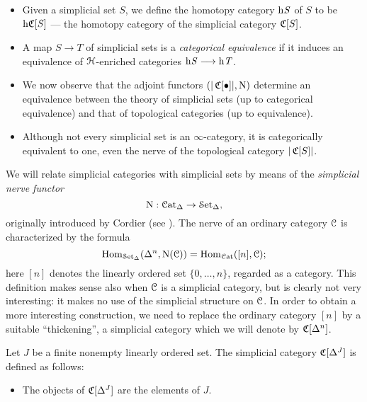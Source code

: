 \begin{1.1.5 inf-cats vs simplicial cats}
\begin{shaded}
\begin{itemize}
\begin{itemize}\squishlist
\item Given a simplicial set $S$, we define the homotopy category $\rm{h} \it{S}$ of $S$ to be $\rm{h} \it{\operatorname{\mathfrak{C}}}[S]$ --- the homotopy category of the simplicial category $\operatorname{\mathfrak{C}}[S]$.
\item A map $S\to T$ of simplicial sets is a \textit{categorical equivalence} if it induces an equivalence of $\operatorname{\mathcal{H}}$-enriched categories $\rm{h} \it{S}\longrightarrow\rm{h} \it{T}$.
\item We now observe that the adjoint functors $(|\operatorname{\mathfrak{C}}[ \bullet ]|, \operatorname{N} )$
determine an equivalence between the theory of simplicial sets (up to categorical equivalence)
and that of topological categories (up to equivalence). 
\item Although not every simplicial set is an $\infty$-category, it is categorically equivalent to one, even the nerve of the topological category $|\operatorname{\mathfrak{C}}[S]|$.
\end{itemize}
\end{itemize}
\end{shaded}


We will relate simplicial categories with simplicial sets by means of the {\it simplicial nerve functor}
$$ \operatorname{N}: \operatorname{\mathcal{C}at_{\Delta}} \rightarrow \operatorname{\mathcal{S}et_{\Delta}},$$
originally introduced by Cordier (see \cite{coherentnerve}).
The nerve of an ordinary category $\operatorname{\mathcal{C}}$ is characterized by the formula
$$ \operatorname{Hom}_{ \operatorname{\mathcal{S}et_{\Delta}}}( \Delta^n, \operatorname{N}(\operatorname{\mathcal{C}})) = \operatorname{Hom}_{\operatorname{\mathcal{C}at}}( [n], \operatorname{\mathcal{C}} );$$
here $[n]$ denotes the linearly ordered set $\{ 0, \ldots, n\}$, regarded
as a category. This
definition makes sense also when $\operatorname{\mathcal{C}}$ is a simplicial
category, but is clearly not very interesting: it makes no use of
the simplicial structure on $\operatorname{\mathcal{C}}$. In order to obtain a more interesting construction,
we need to replace the ordinary category $[n]$ by a suitable ``thickening'', a simplicial
category which we will denote by $\operatorname{\mathfrak{C}}[\Delta^n]$.

\begin{definition}\label{csimp1}
Let $J$ be a finite nonempty linearly ordered set. The simplicial category
$\operatorname{\mathfrak{C}}[\Delta^J]$ is defined as follows:
\begin{itemize}
\item The objects of $\operatorname{\mathfrak{C}}[\Delta^J]$ are the elements of
$J$.


\end{itemize}
\end{definition}
\end{1.1.5 inf-cats vs simplicial cats}
